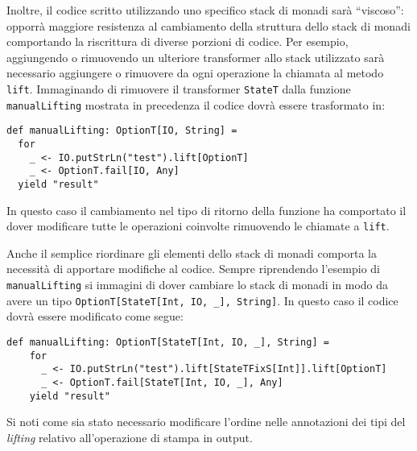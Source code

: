 Inoltre, il codice scritto utilizzando uno specifico stack di monadi sarà ``viscoso'': opporrà maggiore resistenza al cambiamento della struttura dello stack di monadi comportando la riscrittura di diverse porzioni di codice. Per esempio, aggiungendo o rimuovendo un ulteriore transformer allo stack utilizzato sarà necessario aggiungere o rimuovere da ogni operazione la chiamata al metodo \lstinline{lift}. Immaginando di rimuovere il transformer \lstinline{StateT} dalla funzione \lstinline{manualLifting} mostrata in precedenza il codice dovrà essere trasformato in:
\begin{lstlisting}[language=scala3]
def manualLifting: OptionT[IO, String] =
  for
    _ <- IO.putStrLn("test").lift[OptionT]
    _ <- OptionT.fail[IO, Any]
  yield "result"
\end{lstlisting}
In questo caso il cambiamento nel tipo di ritorno della funzione ha comportato il dover modificare tutte le operazioni coinvolte rimuovendo le chiamate a \lstinline{lift}.

Anche il semplice riordinare gli elementi dello stack di monadi comporta la necessità di apportare modifiche al codice. Sempre riprendendo l'esempio di \lstinline{manualLifting} si immagini di dover cambiare lo stack di monadi in modo da avere un tipo \lstinline{OptionT[StateT[Int, IO, _], String]}. In questo caso il codice dovrà essere modificato come segue:
\begin{lstlisting}[language=scala3]
  def manualLifting: OptionT[StateT[Int, IO, _], String] =
    for
      _ <- IO.putStrLn("test").lift[StateTFixS[Int]].lift[OptionT]
      _ <- OptionT.fail[StateT[Int, IO, _], Any]
    yield "result"
\end{lstlisting}
Si noti come sia stato necessario modificare l'ordine nelle annotazioni dei tipi del \emph{lifting} relativo all'operazione di stampa in output.

